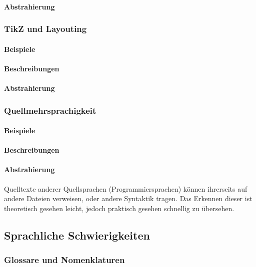 \paragraph*{Abstrahierung}

\subsubsection{TikZ und Layouting}\label{problems:advanced:layouting}
\paragraph*{Beispiele}
\paragraph*{Beschreibungen}
\paragraph*{Abstrahierung}

\subsubsection{Quellmehrsprachigkeit}\label{problems:special:sourcecode}
\paragraph*{Beispiele}
\paragraph*{Beschreibungen}
\paragraph*{Abstrahierung}
Quelltexte anderer Quellsprachen (Programmiersprachen) können ihrerseits auf andere Dateien verweisen, oder andere Syntaktik tragen. Das Erkennen dieser ist theoretisch gesehen leicht, jedoch praktisch gesehen schnellig zu übersehen. 









\subsection{Sprachliche Schwierigkeiten}\label{problems:additional}
\subsubsection{Glossare und Nomenklaturen}
